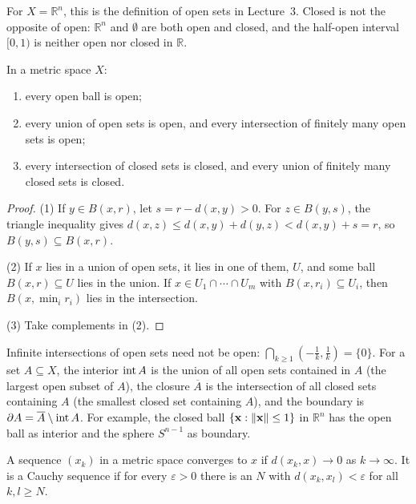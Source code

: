 For $X = \mathbb{R}^n$, this is the definition of open sets in Lecture~3. Closed is not the opposite of open: $\mathbb{R}^n$ and $\emptyset$ are both open and closed, and the half-open interval $[0, 1)$ is neither open nor closed in $\mathbb{R}$.

\begin{proposition}\label{A-prop:open-sets}
    In a metric space $X$:
    \begin{enumerate}
        \item every open ball is open;
        \item every union of open sets is open, and every intersection of finitely many open sets is open;
        \item every intersection of closed sets is closed, and every union of finitely many closed sets is closed.
    \end{enumerate}
\end{proposition}

\begin{proof}
    (1) If $y \in B(x, r)$, let $s = r - d(x, y) > 0$. For $z \in B(y, s)$, the triangle inequality gives $d(x, z) \leq d(x, y) + d(y, z) < d(x, y) + s = r$, so $B(y, s) \subseteq B(x, r)$.

    (2) If $x$ lies in a union of open sets, it lies in one of them, $U$, and some ball $B(x, r) \subseteq U$ lies in the union. If $x \in U_1 \cap \cdots \cap U_m$ with $B(x, r_i) \subseteq U_i$, then $B(x, \min_i r_i)$ lies in the intersection.

    (3) Take complements in (2).
\end{proof}

Infinite intersections of open sets need not be open: $\bigcap_{k \geq 1}(-\frac{1}{k}, \frac{1}{k}) = \{0\}$. For a set $A \subseteq X$, the interior $\operatorname{int} A$ is the union of all open sets contained in $A$ (the largest open subset of $A$), the closure $\overline{A}$ is the intersection of all closed sets containing $A$ (the smallest closed set containing $A$), and the boundary is $\partial A = \overline{A} \setminus \operatorname{int} A$. For example, the closed ball $\{\mathbf{x} : \lVert \mathbf{x} \rVert \leq 1\}$ in $\mathbb{R}^n$ has the open ball as interior and the sphere $S^{n-1}$ as boundary.

\begin{definition}[Convergence]\label{A-def:convergence}
    A sequence $(x_k)$ in a metric space converges to $x$ if $d(x_k, x) \to 0$ as $k \to \infty$. It is a Cauchy sequence if for every $\varepsilon > 0$ there is an $N$ with $d(x_k, x_l) < \varepsilon$ for all $k, l \geq N$.
\end{definition}

